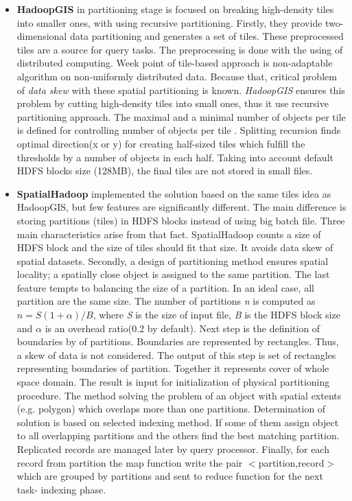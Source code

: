 \documentclass[a4paper,12pt,oneside]{report}
\begin{document}
	\begin{itemize}
		\item \textbf{HadoopGIS} in partitioning stage is focused on breaking
		high-density tiles into smaller ones, with using 
		recursive partitioning. Firstly, they provide two-dimensional data partitioning
		and generates a set of tiles.
		These preprocessed tiles are a source for query tasks. The preprocessing is done
		with the using of distributed computing.
		Week point of tile-based approach is non-adaptable algorithm on non-uniformly
		distributed data. Because that, 
		critical problem of \textit{data skew} with these spatial partitioning is
		known. \textit{HadoopGIS} ensures 
		this problem by cutting high-density tiles into small ones, thus it use
		recursive partitioning approach. The maximal and a minimal number of objects per
		tile is defined for controlling 
		number of objects per tile . Splitting recursion 
		finds optimal direction(x or y) for creating half-sized tiles which fulfill the
		thresholds by a number of objects 
		in each half.  Taking into account default HDFS blocks size (128MB), the final
		tiles are not stored in small files.
		
		\item  \textbf{SpatialHadoop} implemented the solution  based on the same tiles
		idea as HadoopGIS, but few features 
		are significantly different.
		The main difference is storing partitions (tiles) in HDFS blocks  instead of
		using big batch file. Three main characteristics arise from that fact.
		SpatialHadoop counts 
		a size of HDFS block and the size of tiles should fit that size. It avoids data
		skew of spatial datasets. 
		Secondly, a design of partitioning method ensures spatial locality; a spatially
		close object is assigned to the same 
		partition. The last feature tempts to balancing the size of a partition. In an
		ideal case, all partition are the 
		same size. The number of partitions \emph{n} is computed as $n=S(1+ \alpha)/B$,
		where \emph{S} is the size of input file, \emph{B} is the HDFS block size and
		$\alpha$ is an overhead ratio(0.2 by default). 
		Next step is the definition of boundaries by of partitions. Boundaries are
		represented by rectangles. Thus, a skew of data is not considered. 
		The output of this step is set of rectangles representing  boundaries of
		partition. Together it represents cover 
		of whole space domain. The result is input for initialization of physical
		partitioning procedure. The method solving 
		the problem of an object with spatial extents (e.g. polygon) which overlaps more
		than one partitions. Determination 
		of solution is based on selected indexing method. If some of them assign object
		to all overlapping partitions and 
		the others find the best matching partition. Replicated records are managed
		later by  query processor. Finally, 
		for each record from partition the map function write the pair
		$<$partition,record$>$ which are grouped by 
		partitions and sent to reduce function for the next task- indexing phase.
	\end{itemize}
	
\end{document}
